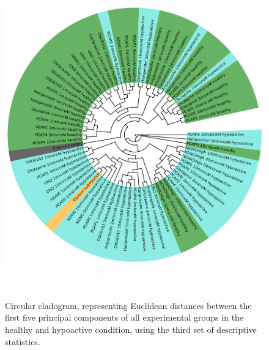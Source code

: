 \documentclass[a4paper,12pt]{article}
\begin{document}
\begin{figure}[h!]
\begin{center}
\includegraphics[width=14cm,height=14cm]{DarkApoLow_set3_PCA_tree_A.png}
\caption{Circular cladogram, representing Euclidean distances between the first five principal components of all experimental groups in the healthy and hypoactive condition, using the third set of descriptive statistics.}
\end{center}
\end{figure}
\newpage
\end{document}
